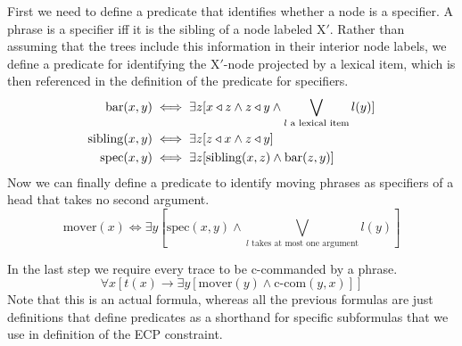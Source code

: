 \begin{examplebox}
    \clearpage
    First we need to define a predicate that identifies whether a node is a specifier.
    A phrase is a specifier iff it is the sibling of a node labeled X$'$.
    Rather than assuming that the trees include this information in their interior node labels, we define a predicate for identifying the X$'$-node projected by a lexical item, which is then referenced in the definition of the predicate for specifiers.
    \begin{align*}
        \mathrm{bar}(x,y) & \iff 
            \exists z [
                x \triangleleft z
                \wedge
                z \triangleleft y
                \wedge
                \bigvee_{l \text{ a lexical item}} l(y)
                ]\\
        \mathrm{sibling}(x,y) & \iff
            \exists z [
                z \triangleleft x
                \wedge
                z \triangleleft y
                ]\\
        \mathrm{spec}(x,y) & \iff
            \exists z [
                \mathrm{sibling}(x,z)
                \wedge
                \mathrm{bar}(z,y)
                ]
    \end{align*}
    Now we can finally define a predicate to identify moving phrases as specifiers of a head that takes no second argument.
    \[
        \mathrm{mover}(x) \iff
            \exists y [
                \mathrm{spec}(x,y)
                \wedge
                \bigvee_{l \text{ takes at most one argument}} l(y)
            ]
    \]

    In the last step we require every trace to be c-commanded by a phrase.
    \[
        \forall x [
            t(x) \rightarrow
                \exists y
                    [
                    \mathrm{mover}(y)
                    \wedge
                    \text{c-com}(y,x)
                ]
        ]
    \]
    Note that this is an actual formula, whereas all the previous formulas are just definitions that define predicates as a shorthand for specific subformulas that we use in definition of the ECP constraint.


\end{examplebox}
